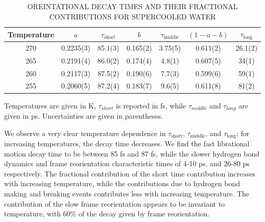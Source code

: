 \begin{table}[h] \centering \caption{OREINTATIONAL DECAY TIMES AND
    THEIR FRACTIONAL CONTRIBUTIONS FOR SUPERCOOLED WATER\label{tab:supOrient}}
\begin{tabular}{ccccccc}
\hline
\hline
 Temperature & $a$ & $\tau_\mathrm{short}$& $b$ &
                                                  $\tau_\mathrm{middle}$
  & $(1-a-b)$ & $\tau_\mathrm{long}$\\
\hline
270 &0.2235(3) &85.1(3) & 0.165(2) & 3.75(5) & 0.611(2) & 26.1(2)\\
265 &0.2191(4) &86.0(2) & 0.174(4) & 4.8(1) & 0.607(5) & 34(1)\\
260 &0.2117(3) &87.5(2) & 0.190(6) & 7.7(3) & 0.599(6) & 59(1)\\
255 &0.2060(5) &87.2(4) & 0.183(7) & 9.6(5) & 0.611(8) & 81(2)\\
\hline
\hline
\end{tabular}
\begin{flushleft}
Temperatures are given in K, $\tau_{short}$ is reported in fs, while $\tau_{middle}$ and
$\tau_{long}$ are given in ps. Uncertainties are given in parentheses.
\end{flushleft}
\end{table}

We observe a very clear temperature dependence in
$\tau_\mathrm{short}$, $\tau_\mathrm{middle}$, and
$\tau_\mathrm{long}$; for increasing temperatures, the decay time
decreases. We find the fast librational motion decay time to be
between 85 fs and 87 fs, while the slower hydrogen bond dynamics and
frame reorientation characteristic times of 4-10 ps, and 26-80 ps
respectively.  The fractional contribution of the short time
contribution increases with increasing temperature, while the
contributions due to hydrogen bond making and breaking events
contributes less with increasing temperature. The contribution of the slow frame
reorientation appears to be invariant to temperature, with 60$\%$
of the decay given by frame reorientation.


